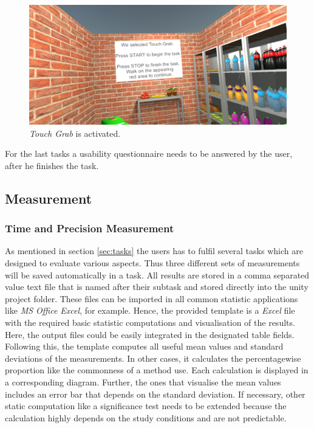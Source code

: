 \begin{figure}[H] 
	\center 
	\includegraphics[width=12cm]{Images/TaskWall_2.PNG}
	\caption[\textit{Touch Grab} is activated.]{\textit{Touch Grab} is activated.}
	\label{fig:taskW2}
\end{figure}

For the last tasks a usability questionnaire needs to be answered by the user, after he finishes the task. 


\subsection{Measurement} \label{sec:measurement}

\subsubsection{Time and Precision Measurement}
As mentioned in section \ref{sec:tasks} the users has to fulfil several tasks which are designed to evaluate various aspects. Thus three different sets of measurements will be saved automatically in a task. All results are stored in a comma separated value text file that is named after their subtask and stored directly into the unity project folder. These files can be imported in all common statistic applications like \textit{MS Office Excel}, for example. Hence, the provided template is a \textit{Excel} file with the required basic statistic computations and visualisation of the results. Here, the output files could be easily integrated in the designated table fields. Following this, the template computes all useful mean values and standard deviations of the measurements. In other cases, it calculates the percentagewise proportion like the commonness of a method use. Each calculation is displayed in a corresponding diagram. Further, the ones that visualise the mean values includes an error bar that depends on the standard deviation. If necessary, other static computation like a significance test needs to be extended because the calculation highly depends on the study conditions and are not predictable.

